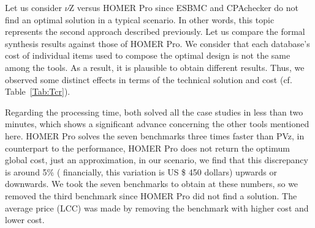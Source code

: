 \documentclass[journal]{IEEEtran}
\begin{document}
Let us consider $\nu$Z versus HOMER Pro since ESBMC and CPAchecker do not find an optimal solution in a typical scenario. In other words, this topic represents the second approach described previously. Let us compare the formal synthesis results against those of HOMER Pro. We consider that each database's cost of individual items used to compose the optimal design is not the same among the tools. As a result, it is plausible to obtain different results. Thus, we observed some distinct effects in terms of the technical solution and cost (cf. Table~\ref{Tab:Tcr}). 

Regarding the processing time, both solved all the case studies in less than two minutes, which shows a significant advance concerning the other tools mentioned here. HOMER Pro solves the seven benchmarks three times faster than PVz, in counterpart to the performance, HOMER Pro does not return the optimum global cost, just an approximation, in our scenario, we find that this discrepancy is around 5\% ( financially, this variation is US \$ 450 dollars) upwards or downwards. We took the seven benchmarks to obtain at these numbers, so we removed the third benchmark since HOMER Pro did not find a solution. The average price (LCC) was made by removing the benchmark with higher cost and lower cost.
\end{document}
